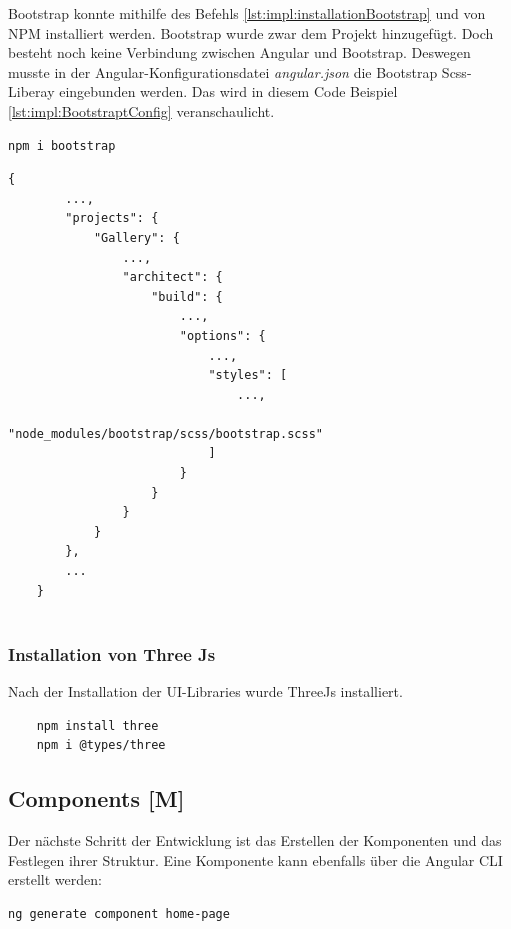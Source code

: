 Bootstrap konnte mithilfe des Befehls \ref{lst:impl:installationBootstrap} und von NPM installiert werden. Bootstrap wurde zwar dem Projekt hinzugefügt. Doch besteht noch keine Verbindung zwischen Angular und Bootstrap. Deswegen musste in der Angular-Konfigurationsdatei \emph{angular.json} die Bootstrap Scss-Liberay eingebunden werden. Das wird in diesem Code Beispiel \ref{lst:impl:BootstraptConfig} veranschaulicht.

\begin{lstlisting}[caption={{Terminal - Bootstrap Installation}},language=bash,label=lst:impl:installationBootstrap]
    npm i bootstrap
\end{lstlisting}

\begin{lstlisting}[caption={{angular.json - Bootstrap Angular Verknüpfung}},label=lst:impl:BootstraptConfig]
    {
        ...,
        "projects": {
            "Gallery": {
                ...,
                "architect": {
                    "build": {
                        ...,
                        "options": {
                            ...,
                            "styles": [
                                ...,
                                "node_modules/bootstrap/scss/bootstrap.scss"
                            ]
                        }
                    }
                }
            }
        },
        ...
    }
    
\end{lstlisting}


\subsubsection{Installation von Three Js}
Nach der Installation der UI-Libraries wurde ThreeJs installiert. 

\begin{lstlisting}
    npm install three
    npm i @types/three
\end{lstlisting}

\subsection{Components [M]}
\label{components}
Der nächste Schritt der Entwicklung ist das Erstellen der Komponenten und das Festlegen ihrer Struktur. Eine Komponente kann ebenfalls über die Angular CLI erstellt werden:

\begin{lstlisting}[caption={{Terminal - Component erstellen}},language=bash,label=lst:impl:addComponent]
    ng generate component home-page
\end{lstlisting}

